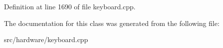 Definition at line 1690 of file keyboard.\-cpp.



The documentation for this class was generated from the following file\-:\begin{DoxyCompactItemize}
\item 
src/hardware/keyboard.\-cpp\end{DoxyCompactItemize}
